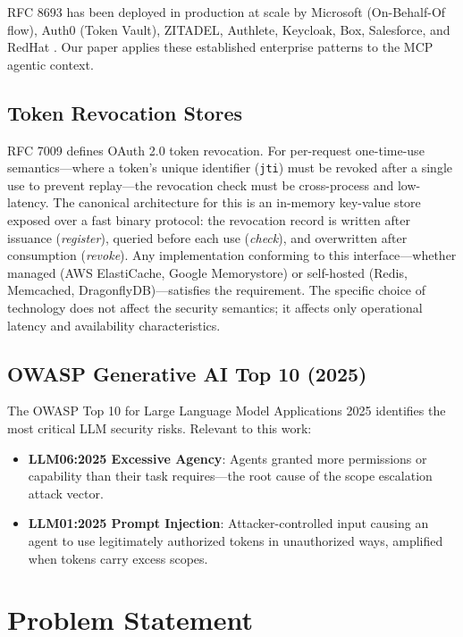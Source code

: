 \documentclass[journal]{IEEEtran}
\begin{document}
RFC 8693 has been deployed in production at scale by Microsoft (On-Behalf-Of
flow), Auth0 (Token Vault), ZITADEL, Authlete, Keycloak, Box, Salesforce, and
RedHat \cite{rfc8693_deploy}. Our paper applies these established enterprise
patterns to the MCP agentic context.

\subsection{Token Revocation Stores}

RFC 7009 \cite{rfc7009} defines OAuth 2.0 token revocation. For per-request
one-time-use semantics---where a token's unique identifier (\texttt{jti}) must be
revoked after a single use to prevent replay---the revocation check must be
cross-process and low-latency. The canonical architecture for this is an
in-memory key-value store exposed over a fast binary protocol: the revocation
record is written after issuance (\textit{register}), queried before each use
(\textit{check}), and overwritten after consumption (\textit{revoke}). Any
implementation conforming to this interface---whether managed (AWS ElastiCache,
Google Memorystore) or self-hosted (Redis, Memcached, DragonflyDB)---satisfies
the requirement. The specific choice of technology does not affect the security
semantics; it affects only operational latency and availability characteristics.

\subsection{OWASP Generative AI Top 10 (2025)}

The OWASP Top 10 for Large Language Model Applications 2025 \cite{owasp_genai}
identifies the most critical LLM security risks. Relevant to this work:

\begin{itemize}
  \item \textbf{LLM06:2025 Excessive Agency}: Agents granted more permissions
        or capability than their task requires---the root cause of the scope
        escalation attack vector.
  \item \textbf{LLM01:2025 Prompt Injection}: Attacker-controlled input causing
        an agent to use legitimately authorized tokens in unauthorized ways,
        amplified when tokens carry excess scopes.
\end{itemize}


\section{Problem Statement}
\label{sec:problem}
\end{document}
